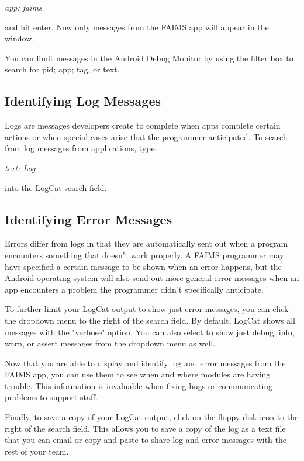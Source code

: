 {\em app: faims}

and hit enter. Now only messages from the FAIMS app will appear in the window.

{}

You can limit messages in the Android Debug Monitor by using the filter box to search for pid; app; tag, or text.

\subsection[identifying-log-messages]{Identifying Log Messages}

Logs are messages developers create to complete when apps complete certain actions or when special cases arise that the programmer anticipated. To search from log messages from applications, type:

{\em text: Log}

into the LogCat search field.

\subsection[identifying-error-messages]{Identifying Error Messages}

Errors differ from logs in that they are automatically sent out when a program encounters something that doesn't work properly. A FAIMS programmer may have specified a certain message to be shown when an error happens, but the Android operating system will also send out more general error messages when an app encounters a problem the programmer didn't specifically anticipate.

To further limit your LogCat output to show just error messages, you can click the dropdown menu to the right of the search field. By default, LogCat shows all messages with the "verbose" option. You can also select to show just debug, info, warn, or assert messages from the dropdown menu as well.

{}

Now that you are able to display and identify log and error messages from the FAIMS app, you can use them to see when and where modules are having trouble. This information is invaluable when fixing bugs or communicating problems to support staff.

Finally, to save a copy of your LogCat output, click on the floppy disk icon to the right of the search field. This allows you to save a copy of the log as a text file that you can email or copy and paste to share log and error messages with the rest of your team.

